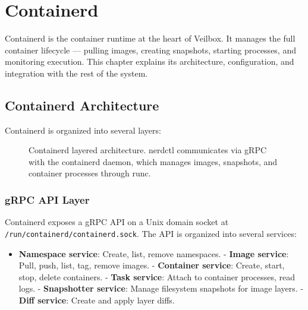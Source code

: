 \chapter{Containerd}
\label{ch:containerd}

Containerd is the container runtime at the heart of Veilbox. It manages
the full container lifecycle — pulling images, creating snapshots,
starting processes, and monitoring execution. This chapter explains its
architecture, configuration, and integration with the rest of the system.

\section{Containerd Architecture}

Containerd is organized into several layers:

\begin{figure}[H]
\centering
{}
\caption{Containerd layered architecture. nerdctl communicates via gRPC
with the containerd daemon, which manages images, snapshots, and
container processes through runc.}
\label{fig:containerd}
\end{figure}

\subsection{gRPC API Layer}

Containerd exposes a gRPC API on a Unix domain socket at
\texttt{/run/containerd/containerd.sock}. The API is organized into
several services:

\begin{itemize}[nosep]
  \item \textbf{Namespace service}: Create, list, remove namespaces.
  - \textbf{Image service}: Pull, push, list, tag, remove images.
  - \textbf{Container service}: Create, start, stop, delete containers.
  - \textbf{Task service}: Attach to container processes, read logs.
  - \textbf{Snapshotter service}: Manage filesystem snapshots for image
        layers.
  - \textbf{Diff service}: Create and apply layer diffs.
\end{itemize}

